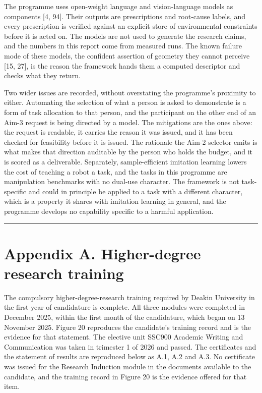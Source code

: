 \documentclass[
  11pt,
]{article}
\begin{document}
The programme uses open-weight language and vision-language models as
components {[}4, 94{]}. Their outputs are prescriptions and root-cause
labels, and every prescription is verified against an explicit store of
environmental constraints before it is acted on. The models are not used
to generate the research claims, and the numbers in this report come
from measured runs. The known failure mode of these models, the
confident assertion of geometry they cannot perceive {[}15, 27{]}, is
the reason the framework hands them a computed descriptor and checks
what they return.

Two wider issues are recorded, without overstating the programme's
proximity to either. Automating the selection of what a person is asked
to demonstrate is a form of task allocation to that person, and the
participant on the other end of an Aim-3 request is being directed by a
model. The mitigations are the ones above: the request is readable, it
carries the reason it was issued, and it has been checked for
feasibility before it is issued. The rationale the Aim-2 selector emits
is what makes that direction auditable by the person who holds the
budget, and it is scored as a deliverable. Separately, sample-efficient
imitation learning lowers the cost of teaching a robot a task, and the
tasks in this programme are manipulation benchmarks with no dual-use
character. The framework is not task-specific and could in principle be
applied to a task with a different character, which is a property it
shares with imitation learning in general, and the programme develops no
capability specific to a harmful application.

\begin{center}\rule{0.5\linewidth}{0.5pt}\end{center}

\hypertarget{appendix-a.-higher-degree-research-training}{%
\section{Appendix A. Higher-degree research
training}\label{appendix-a.-higher-degree-research-training}}

The compulsory higher-degree-research training required by Deakin
University in the first year of candidature is complete. All three
modules were completed in December 2025, within the first month of the
candidature, which began on 13 November 2025. Figure 20 reproduces the
candidate's training record and is the evidence for that statement. The
elective unit SSC900 Academic Writing and Communication was taken in
trimester 1 of 2026 and passed. The certificates and the statement of
results are reproduced below as A.1, A.2 and A.3. No certificate was
issued for the Research Induction module in the documents available to
the candidate, and the training record in Figure 20 is the evidence
offered for that item.
\end{document}
